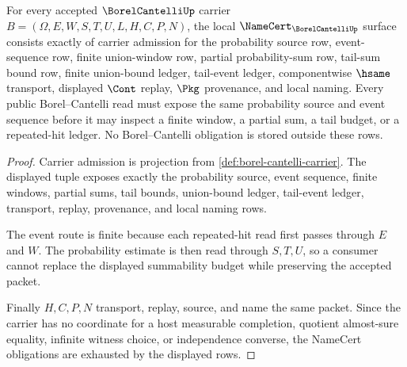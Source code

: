 \begin{theorem}
\label{thm:borel-cantelli-namecert-obligations}
For every accepted $\BorelCantelliUp$ carrier $B=(\Omega,E,W,S,T,U,L,H,C,P,N)$, the local $\NameCert_{\BorelCantelliUp}$ surface consists exactly of carrier admission for the probability source row, event-sequence row, finite union-window row, partial probability-sum row, tail-sum bound row, finite union-bound ledger, tail-event ledger, componentwise $\hsame$ transport, displayed $\Cont$ replay, $\Pkg$ provenance, and local naming. Every public Borel--Cantelli read must expose the same probability source and event sequence before it may inspect a finite window, a partial sum, a tail budget, or a repeated-hit ledger. No Borel--Cantelli obligation is stored outside these rows.
\end{theorem}
\begin{proof}
Carrier admission is projection from \autoref{def:borel-cantelli-carrier}. The displayed tuple exposes exactly the probability source, event sequence, finite windows, partial sums, tail bounds, union-bound ledger, tail-event ledger, transport, replay, provenance, and local naming rows.

The event route is finite because each repeated-hit read first passes through $E$ and $W$. The probability estimate is then read through $S,T,U$, so a consumer cannot replace the displayed summability budget while preserving the accepted packet.

Finally $H,C,P,N$ transport, replay, source, and name the same packet. Since the carrier has no coordinate for a host measurable completion, quotient almost-sure equality, infinite witness choice, or independence converse, the NameCert obligations are exhausted by the displayed rows.
\end{proof}

